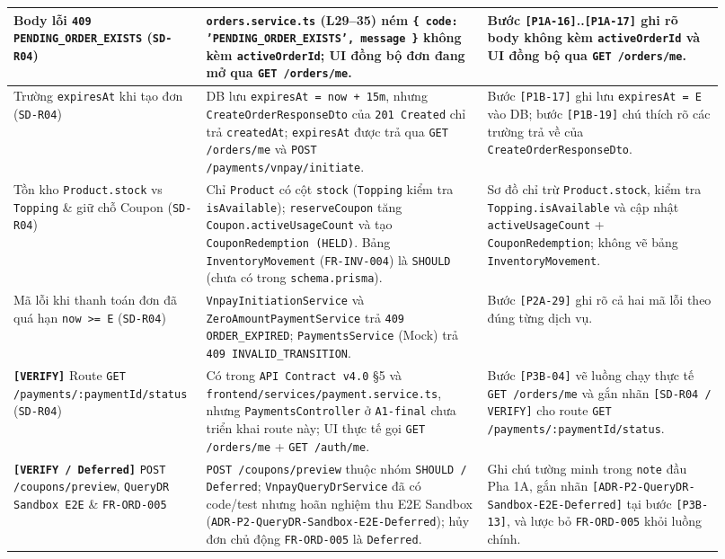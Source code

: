 \begin{longtable}{>{\raggedright\arraybackslash}p{0.22\linewidth}>{\raggedright\arraybackslash}p{0.38\linewidth}>{\raggedright\arraybackslash}p{0.32\linewidth}}
Body lỗi \texttt{409 PENDING\_ORDER\_EXISTS} (\texttt{SD-R04}) & \texttt{orders.service.ts} (L29--35) ném \texttt{\{ code: 'PENDING\_ORDER\_EXISTS', message \}} \textbf{không kèm \texttt{activeOrderId}}; UI đồng bộ đơn đang mở qua \texttt{GET /orders/me}. & Bước \texttt{[P1A-16]}..\texttt{[P1A-17]} ghi rõ body không kèm \texttt{activeOrderId} và UI đồng bộ qua \texttt{GET /orders/me}. \\ \hline
Trường \texttt{expiresAt} khi tạo đơn (\texttt{SD-R04}) & DB lưu \texttt{expiresAt = now + 15m}, nhưng \texttt{CreateOrderResponseDto} của \texttt{201 Created} chỉ trả \texttt{createdAt}; \texttt{expiresAt} được trả qua \texttt{GET /orders/me} và \texttt{POST /payments/vnpay/initiate}. & Bước \texttt{[P1B-17]} ghi lưu \texttt{expiresAt = E} vào DB; bước \texttt{[P1B-19]} chú thích rõ các trường trả về của \texttt{CreateOrderResponseDto}. \\ \hline
Tồn kho \texttt{Product.stock} vs \texttt{Topping} \& giữ chỗ Coupon (\texttt{SD-R04}) & Chỉ \texttt{Product} có cột \texttt{stock} (\texttt{Topping} kiểm tra \texttt{isAvailable}); \texttt{reserveCoupon} tăng \texttt{Coupon.activeUsageCount} và tạo \texttt{CouponRedemption (HELD)}. Bảng \texttt{InventoryMovement} (\texttt{FR-INV-004}) là \texttt{SHOULD} (chưa có trong \texttt{schema.prisma}). & Sơ đồ chỉ trừ \texttt{Product.stock}, kiểm tra \texttt{Topping.isAvailable} và cập nhật \texttt{activeUsageCount} + \texttt{CouponRedemption}; không vẽ bảng \texttt{InventoryMovement}. \\ \hline
Mã lỗi khi thanh toán đơn đã quá hạn \texttt{now >= E} (\texttt{SD-R04}) & \texttt{VnpayInitiationService} và \texttt{ZeroAmountPaymentService} trả \texttt{409 ORDER\_EXPIRED}; \texttt{PaymentsService} (Mock) trả \texttt{409 INVALID\_TRANSITION}. & Bước \texttt{[P2A-29]} ghi rõ cả hai mã lỗi theo đúng từng dịch vụ. \\ \hline
\textbf{\texttt{[VERIFY]}} Route \texttt{GET /payments/:paymentId/status} (\texttt{SD-R04}) & Có trong \texttt{API Contract v4.0} §5 và \texttt{frontend/services/payment.service.ts}, nhưng \texttt{PaymentsController} ở \texttt{A1-final} chưa triển khai route này; UI thực tế gọi \texttt{GET /orders/me} + \texttt{GET /auth/me}. & Bước \texttt{[P3B-04]} vẽ luồng chạy thực tế \texttt{GET /orders/me} và gắn nhãn \texttt{[SD-R04 / VERIFY]} cho route \texttt{GET /payments/:paymentId/status}. \\ \hline
\textbf{\texttt{[VERIFY / Deferred]}} \texttt{POST /coupons/preview}, \texttt{QueryDR Sandbox E2E} \& \texttt{FR-ORD-005} & \texttt{POST /coupons/preview} thuộc nhóm \texttt{SHOULD / Deferred}; \texttt{VnpayQueryDrService} đã có code/test nhưng hoãn nghiệm thu E2E Sandbox (\texttt{ADR-P2-QueryDR-Sandbox-E2E-Deferred}); hủy đơn chủ động \texttt{FR-ORD-005} là \texttt{Deferred}. & Ghi chú tường minh trong \texttt{note} đầu Pha 1A, gắn nhãn \texttt{[ADR-P2-QueryDR-Sandbox-E2E-Deferred]} tại bước \texttt{[P3B-13]}, và lược bỏ \texttt{FR-ORD-005} khỏi luồng chính. \\ \hline
\end{longtable}
\endgroup

